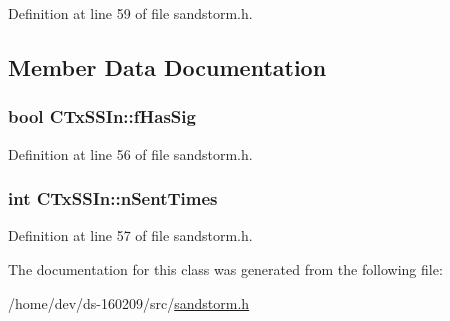 Definition at line 59 of file sandstorm.\+h.



\subsection{Member Data Documentation}
\hypertarget{class_c_tx_s_s_in_a0e09e06a90cee14abdbd390f3ecbfe08}{}
\subsubsection[{f\+Has\+Sig}]{\setlength{\rightskip}{0pt plus 5cm}bool C\+Tx\+S\+S\+In\+::f\+Has\+Sig}\label{class_c_tx_s_s_in_a0e09e06a90cee14abdbd390f3ecbfe08}


Definition at line 56 of file sandstorm.\+h.

\hypertarget{class_c_tx_s_s_in_a1e4cb4930ca28196efe956ddc3310b28}{}
\subsubsection[{n\+Sent\+Times}]{\setlength{\rightskip}{0pt plus 5cm}int C\+Tx\+S\+S\+In\+::n\+Sent\+Times}\label{class_c_tx_s_s_in_a1e4cb4930ca28196efe956ddc3310b28}


Definition at line 57 of file sandstorm.\+h.



The documentation for this class was generated from the following file\+:\begin{DoxyCompactItemize}
\item 
/home/dev/ds-\/160209/src/\hyperlink{sandstorm_8h}{sandstorm.\+h}\end{DoxyCompactItemize}
